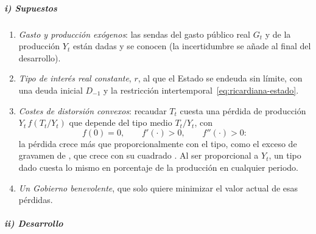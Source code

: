 \documentclass[11pt]{article}
\begin{document}
\subparagraph{i) Supuestos}

\begin{enumerate}
\item \emph{Gasto y producción exógenos}: las sendas del gasto público real $G_t$ y de la producción $Y_t$ están dadas y se conocen (la incertidumbre se añade al final del desarrollo).
\item \emph{Tipo de interés real constante}, $r$, al que el Estado se endeuda sin límite, con una deuda inicial $D_{-1}$ y la restricción intertemporal~\eqref{eq:ricardiana-estado}.
\item \emph{Costes de distorsión convexos}: recaudar $T_t$ cuesta una pérdida de producción $Y_t\,f(T_t/Y_t)$ que depende del tipo medio $T_t/Y_t$, con
  \begin{equation*}
  f(0)=0,\qquad f'(\cdot)>0,\qquad f''(\cdot)>0 :
  \end{equation*}
  la pérdida crece más que proporcionalmente con el tipo, como el exceso de gravamen de , que crece con su cuadrado . Al ser proporcional a $Y_t$, un tipo dado cuesta lo mismo en porcentaje de la producción en cualquier periodo.
\item \emph{Un Gobierno benevolente}, que solo quiere minimizar el valor actual de esas pérdidas.
\end{enumerate}

\subparagraph{ii) Desarrollo}
\end{document}
